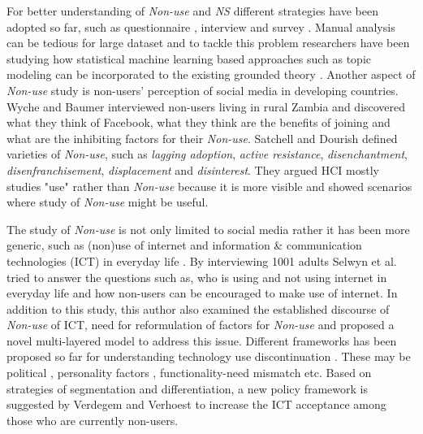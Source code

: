 For better understanding of \emph{Non-use} and \emph{NS} different strategies have been adopted so far, such as questionnaire \cite{hampton2015social, baker2011their}, interview\cite{turan2013reasons} and survey \cite{baumer2015missing, brody2018opting}. Manual analysis can be tedious for large dataset and to tackle this problem researchers have been studying how statistical machine learning based approaches such as topic modeling can be incorporated to the existing grounded theory \cite{baumer2017comparing}. Another aspect of \emph{Non-use} study is non-users' perception of social media in developing countries. Wyche and Baumer \cite{wyche2017imagined} interviewed non-users living in rural Zambia and discovered what they think of Facebook, what they think are the benefits of joining and what are the inhibiting factors for their \emph{Non-use}. Satchell and Dourish \cite{satchell2009beyond} defined varieties of \emph{Non-use}, such as \textit{lagging adoption}, \textit{active resistance}, \textit{disenchantment}, \textit{disenfranchisement}, \textit{displacement} and \textit{disinterest}. They argued HCI mostly studies "use" rather than \emph{Non-use} because it is more visible and showed scenarios where study of \emph{Non-use} might be useful.

The study of \emph{Non-use} is not only limited to social media rather it has been more generic, such as (non)use of internet and information & communication technologies (ICT) in everyday life \cite{selwyn2005whose, selwyn2003apart, verdegem2009profiling, wyatt2003non}. By interviewing 1001 adults Selwyn et al. \cite{selwyn2005whose} tried to answer the questions such as, who is using and not using internet in everyday life and how non-users can be encouraged to make use of internet. In addition to this study, this author also examined \cite{selwyn2003apart} the established discourse of \emph{Non-use} of ICT, need for reformulation of factors for \emph{Non-use} and proposed a novel multi-layered model to address this issue. Different frameworks has been proposed so far for understanding technology use discontinuation \cite{verdegem2009profiling, wyatt2003non, oudshoorn2003users, lapointe2005multilevel, kim2009investigating, marakas1996passive, carroll2002just}. These may be political \cite{wyatt2003non, oudshoorn2003users}, personality factors \cite{lapointe2005multilevel, kim2009investigating, marakas1996passive}, functionality-need mismatch \cite{carroll2002just} etc. Based on strategies of segmentation and differentiation, a new policy framework is suggested by Verdegem and Verhoest \cite{verdegem2009profiling} to increase the ICT acceptance among those who are currently non-users.  

